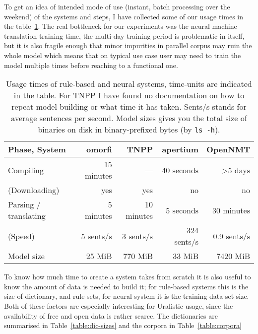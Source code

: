 \documentclass[a4paper,notitlepage]{article}
\begin{document}
To get an idea of intended mode of use (instant, batch processing over the
weekend) of the systems and steps, I have collected some of our usage times in
the table~\ref{table:times}. The real bottleneck for our experiments was the
neural machine translation training time, the multi-day training period is
problematic in itself, but it is also fragile enough that minor impurities in
parallel corpus may ruin the whole model which means that on typical use case
user may need to train the model multiple times before reaching to a functional
one.

\begin{table}
\begin{centering}
    \begin{tabular}{lrrrr}
        \toprule
        Phase, System & \bf omorfi & \bf TNPP & \bf apertium & \bf OpenNMT \\
        \midrule
        Compiling & 15 minutes & --- & 40 seconds & >5 days \\
        (Downloading) & yes & yes & no & no\\
        Parsing / translating & 5 minutes & 10 minutes  & 5 seconds & 30 minutes \\
        (Speed) & 5 sents/s & 3 sents/s & 324 sents/s & 0.9 sents/s \\
        \midrule
        Model size & 25 MiB & 770 MiB & 33 MiB & 7420 MiB \\
        \bottomrule
    \end{tabular}
    \caption{Usage times of rule-based and neural systems, time-units are
    indicated in the table. For TNPP I have found no documentation on how to
    repeat model building or what time it has taken. Sents/s stands for
    average sentences per second. Model sizes gives you the total size of
    binaries on disk in binary-prefixed bytes (by \texttt{ls -h}).
\label{table:times}}
\end{centering}
\end{table}

To know how much time to create a system takes from scratch it is also useful to
know the amount of data is needed to build it; for rule-based systems this is
the size of dictionary, and rule-sets, for neural system it is the training
data set size. Both of these factors are especially interesting for Uralistic
usage, since the availability of free and open data is rather scarce. The
dictionaries are summarised in Table~\ref{table:dic-sizes} and the corpora in
Table~\ref{table:corpora}
\end{document}

